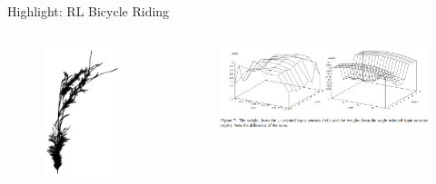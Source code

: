\documentclass{beamer}
\begin{document}
\begin{frame}{Highlight: RL Bicycle Riding}
  \begin{columns}
    \begin{column}{0.3\textwidth}
      \begin{figure}
        \includegraphics[width=0.9\textwidth]{assets/bicycle_1}
      \end{figure}
    \end{column}
    \begin{column}{0.65\textwidth}
      \begin{figure}
        \includegraphics[width=\textwidth]{assets/bicycle_2}
      \end{figure}
    \end{column}
  \end{columns}
\end{frame}
\end{document}
